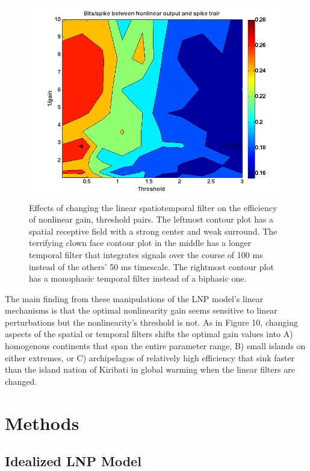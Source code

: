 \documentclass[12pt]{article}
\begin{document}
\begin{figure}[h!!]
\begin{minipage}[b]{0.3\linewidth}
\includegraphics[width=\textwidth]{4f_contour_LNPsimulation_ONcell_monophasicFilter.png}
\end{minipage}
\caption{Effects of changing the linear spatiotemporal filter on the efficiency of nonlinear gain, threshold pairs.  The leftmost contour plot has a spatial receptive field with a strong center and weak surround.  The terrifying clown face contour plot in the middle has a longer temporal filter that integrates signals over the course of 100 ms instead of the others' 50 ms timescale.  The rightmost contour plot has a monophasic temporal filter instead of a biphasic one.}
\label{Figure 9}
\end{figure}

The main finding from these manipulations of the LNP model's linear mechanisms is that the optimal nonlinearity gain seems sensitive to linear perturbations but the nonlinearity's threshold is not.  As in Figure 10, changing aspects of the spatial or temporal filters shifts the optimal gain values into A) homogenous continents that span the entire parameter range, B) small islands on either extremes, or C) archipelagos of relatively high efficiency that sink faster than the island nation of Kiribati in global warming when the linear filters are changed. 

\section{Methods}

\subsection{Idealized LNP Model}
\end{document}
